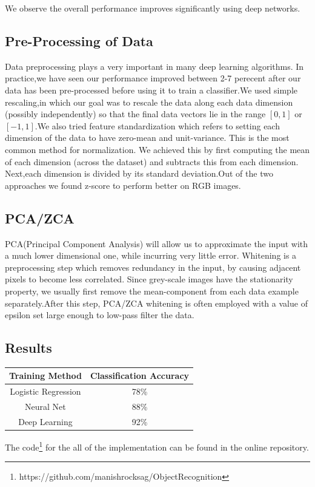 \documentclass[18pt,letterpaper]{article}
\begin{document}
We observe the overall performance improves significantly using deep networks.


\subsection{Pre-Processing of Data}
Data preprocessing plays a very important in many deep learning algorithms. In practice,we have seen our performance improved between 2-7 perecent after our data has been pre-processed before using it to train a classifier.We used simple rescaling,in which our goal was to rescale the data along each data dimension (possibly independently) so that the final data vectors lie in the range $[0, 1]$ or  $[-1, 1]$.We also tried feature standardization which refers to setting each dimension of the data to have zero-mean and unit-variance. This is the most common method for normalization. We achieved this by first computing the mean of each dimension (across the dataset) and subtracts this from each dimension. Next,each dimension is divided by its standard deviation.Out of the two approaches we found z-score to perform better on RGB images.
\subsection{PCA/ZCA}
PCA(Principal Component Analysis) will allow us to approximate the input with a much lower dimensional one, while incurring very little error.
Whitening is a preprocessing step which removes redundancy in the input, by causing adjacent pixels to become less correlated.
Since grey-scale images have the stationarity property, we usually first remove the mean-component from each data example separately.After this step, PCA/ZCA whitening is often employed with a value of epsilon set large enough to low-pass filter the data.

\subsection{Results}

\begin{tabular}{|c|c|}
\hline 
Training Method & Classification Accuracy \\ 
\hline 
Logistic Regression & 78\% \\ 
\hline 
Neural Net & 88\% \\ 
\hline 
Deep Learning & 92\% \\ 
\hline 
\end{tabular} 
The code\footnote{https://github.com/manishrocksag/ObjectRecognition}
for the all of the implementation can be found in the online repository. 
\end{document}
